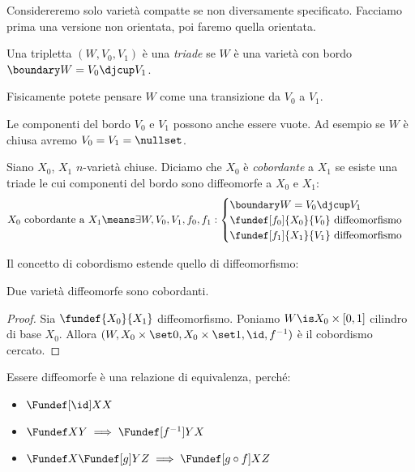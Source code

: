 

Considereremo solo varietà compatte se non diversamente specificato.
Facciamo prima una versione non orientata, poi faremo quella orientata.

\begin{defn}[Triade]
	Una tripletta $(W,V_0,V_1)$ è una \emph{triade} se $W$ è una varietà con bordo $\boundary W=V_0\djcup V_1$.
\end{defn}


Fisicamente potete pensare $W$ come una transizione da $V_0$ a $V_1$.

\begin{oss}
	Le componenti del bordo $V_0$ e $V_1$ possono anche essere vuote.
	Ad esempio se $W$ è chiusa avremo $V_0=V_1=\nullset$.
\end{oss}

\begin{defn}[Cobordismo]
	Siano $X_0$, $X_1$ $n$-varietà chiuse. Diciamo che $X_0$ è \emph{cobordante} a $X_1$ se esiste una triade le cui componenti del bordo sono diffeomorfe a $X_0$ e $X_1$:
	\[\text{$X_0$ cobordante a $X_1$}\means
	\exists W,V_0,V_1,f_0,f_1:\begin{cases}
		\boundary W=V_0\djcup V_1 \\
		\fundef[f_0]{X_0}{V_0}\text{ diffeomorfismo} \\
		\fundef[f_1]{X_1}{V_1}\text{ diffeomorfismo}
	\end{cases}\]
\end{defn}


Il concetto di cobordismo estende quello di diffeomorfismo:

\begin{prop}
	\label{th:diffcob}
	Due varietà diffeomorfe sono cobordanti.
\end{prop}

\begin{proof}
	Sia $\fundef{X_0}{X_1}$ diffeomorfismo.
	Poniamo $W\is X_0\times[0,1]$ cilindro di base $X_0$.
	Allora $(W,X_0\times\set0,X_0\times\set1,\id,f^{-1})$ è il cobordismo cercato.
\end{proof}

\begin{oss}
	Essere diffeomorfe è una relazione di equivalenza, perché:
	\begin{itemize}
		\item $\Fundef[\id]XX$
		\item $\Fundef XY\implies\Fundef[f^{-1}]YX$
		\item $\Fundef X{\Fundef[g]YZ}\implies\Fundef[g\circ f]XZ$
	\end{itemize}
\end{oss}

